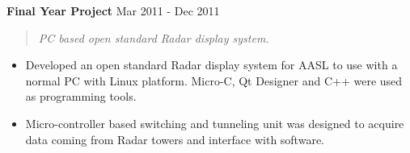 \documentclass[mm]{./assets/res} %
\begin{document}
\begin{resume}
\textbf{Final Year Project} \hfill Mar 2011 - Dec 2011
\begin{quote}
\emph{PC based open standard Radar display system.}
\end{quote}

\begin{itemize} \itemsep -1pt %
\item Developed an open standard Radar display system for AASL to use with a normal PC
with Linux platform. Micro-C, Qt Designer and C++ were used as programming tools.
\item Micro-controller based switching and tunneling unit was designed to acquire data coming from Radar towers and interface with software.
\end{itemize}








\end{resume}
\end{document}
